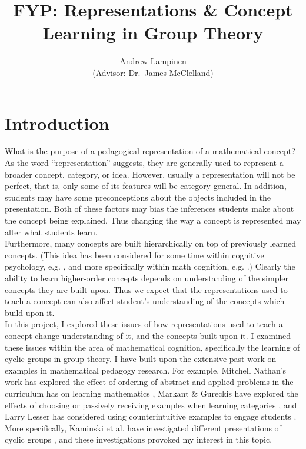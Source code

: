 \documentclass[11pt]{article}
\begin{document}
\title{FYP: Representations \& Concept Learning in Group Theory}
\author{Andrew Lampinen \\ (Advisor: Dr.\ James McClelland)}
\date{}
\maketitle
\section{Introduction}
What is the purpose of a pedagogical representation of a mathematical concept? As the word ``representation'' suggests, they are generally used to represent a broader concept, category, or idea. However, usually a representation will not be perfect, that is, only some of its features will be category-general. In addition, students may have some preconceptions about the objects included in the presentation. Both of these factors may bias the inferences students make about the concept being explained. Thus changing the way a concept is represented may alter what students learn. \\[11pt]
Furthermore, many concepts are built hierarchically on top of previously learned concepts. (This idea has been considered for some time within cognitive psychology, e.g. \cite{Fischer1980}, and more specifically within math cognition, e.g. \cite{Hazzan1999}.) Clearly the ability to learn higher-order concepts depends on understanding of the simpler concepts they are built upon. Thus we expect that the representations used to teach a concept can also affect student's understanding of the concepts which build upon it.\\[11pt]
In this project, I explored these issues of how representations used to teach a concept change understanding of it, and the concepts built upon it. I examined these issues within the area of mathematical cognition, specifically the learning of cyclic groups in group theory. I have built upon the extensive past work on examples in mathematical pedagogy research. For example, Mitchell Nathan's work has explored the effect of ordering of abstract and applied problems in the curriculum has on learning mathematics \cite{Nathan2012}, Markant \& Gureckis have explored the effects of choosing or passively receiving examples when learning categories \cite{Markant2014}, and Larry Lesser has considered using counterintuitive examples to engage students \cite{Lesser1998}. More specifically, Kaminski et al. have investigated different presentations of cyclic groups \cite{Kaminski2008}, and these investigations provoked my interest in this topic. 
\end{document}
